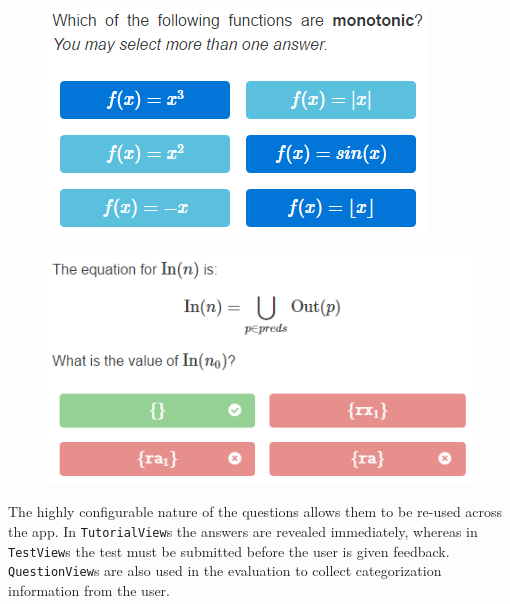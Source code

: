 \documentclass[bsc,twoside,singlespacing,parskip,logo,notimes,normalheadings]{infthesis}
\begin{document}
        \begin{figure}[!ht]
          \hspace{2mm}
          \begin{minipage}{.43\textwidth}
            \includegraphics[width=\textwidth]{img/multiple-choice-q.png}
            \captionsetup{width=\textwidth, justification=centering}
            \label{fig:multi-choice-q}
          \end{minipage}%
          \quad
          \begin{minipage}{.53\textwidth}
            \includegraphics[width=\textwidth, trim=0 0 0 22]{img/answered-q.png}
            \captionsetup{width=\textwidth, justification=centering}
            \label{fig:answered-q}
          \end{minipage}
        \end{figure}

        The highly configurable nature of the questions allows them to
        be re-used across the app. In {\tt TutorialView}s the answers
        are revealed immediately, whereas in {\tt TestView}s the test
        must be submitted before the user is given feedback. {\tt
          QuestionView}s are also used in the evaluation to collect
        categorization information from the user.
\end{document}
